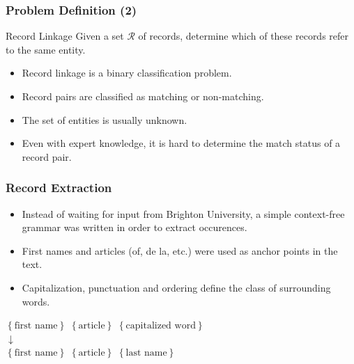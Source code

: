 \documentclass[12pt]{beamer}
\theoremstyle{break}
\newcommand*{\parsevar}[1]{\ensuremath{\left\{\textrm{#1}\right\}}}
\begin{document}
\begin{frame}
	\frametitle{Problem Definition (2)}
	
	\begin{block}{Record Linkage}
		Given a set $\mathcal{R}$ of records, determine which of these records refer to the same entity.
	\end{block}
	
	\begin{itemize}
		\item Record linkage is a \alert{binary classification problem}.
		\item Record pairs are classified as \alert{matching} or \alert{non-matching}.
		\item The set of entities is usually unknown.
		\item Even with expert knowledge, it is hard to determine the match status of a record pair.
	\end{itemize}

\end{frame}




\begin{frame}
	\frametitle{Record Extraction}

	\begin{itemize}
		\item Instead of waiting for input from Brighton University, a simple context-free grammar was written in order to extract occurences.
  		\item First names and articles (of, de la, etc.) were used as anchor points in the text.
  		\item Capitalization, punctuation and ordering define the class of surrounding words.
  	\end{itemize}
  	
  	\begin{center}
  		\parsevar{first name} \parsevar{article} \parsevar{capitalized word} \\
  		$\downarrow$ \\ 
  		\parsevar{first name} \parsevar{article} \parsevar{last name}
  	\end{center}
\end{frame}


\end{document}
